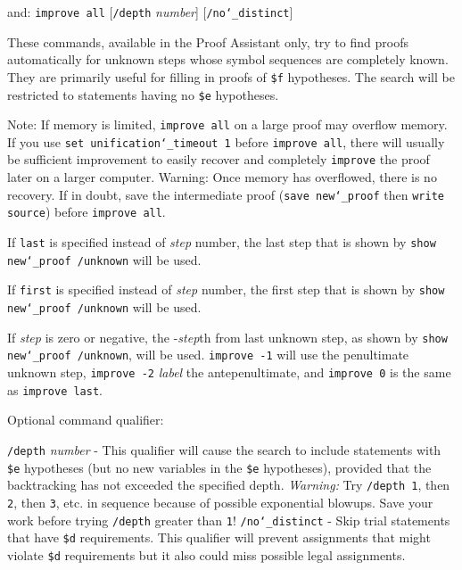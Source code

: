    and:   \texttt{improve all} [\texttt{/depth} {\em number}]
                                              [\texttt{/no{\char`\_}distinct}]

These commands, available in the Proof Assistant
only, try to find proofs automatically for unknown steps whose symbol
sequences are completely known.  They are primarily useful for filling in
proofs of \texttt{\$f} hypotheses.  The
search will be restricted to statements having no
\texttt{\$e} hypotheses.

\begin{sloppypar} %
Note:  If memory is limited, \texttt{improve all} on a large proof may
overflow memory.  If you use \texttt{set unification{\char`\_}timeout 1}
before \texttt{improve all}, there will usually be sufficient
improvement to easily recover and completely \texttt{improve} the proof
later on a larger computer.  Warning:  Once memory has overflowed, there
is no recovery.  If in doubt, save the intermediate proof (\texttt{save
new{\char`\_}proof} then \texttt{write source}) before \texttt{improve
all}.
\end{sloppypar}

If \texttt{last} is specified instead of {\em step} number, the last
step that is shown by \texttt{show new{\char`\_}proof /unknown} will be
used.

If \texttt{first} is specified instead of {\em step} number, the first
step that is shown by \texttt{show new{\char`\_}proof /unknown} will be
used.

If {\em step} is zero or negative, the -{\em step}th from last unknown
step, as shown by \texttt{show new{\char`\_}proof /unknown}, will be
used.  \texttt{improve -1} will use the penultimate
unknown step, \texttt{improve -2} {\em label} the antepenultimate, and
\texttt{improve 0} is the same as \texttt{improve last}.

Optional command qualifier:

    \texttt{/depth} {\em number} - This qualifier will cause the search
        to include
        statements with \texttt{\$e} hypotheses (but no new variables in
        the \texttt{\$e}
        hypotheses), provided that the backtracking has not exceeded the
        specified depth. {\em Warning:}  Try \texttt{/depth 1},
        then \texttt{2}, then \texttt{3}, etc.
        in sequence because of possible exponential blowups.  Save your
        work before trying \texttt{/depth} greater than \texttt{1}!
    \texttt{/no{\char`\_}distinct} - Skip trial statements that have
        \texttt{\$d} requirements.
        This qualifier will prevent assignments that might violate \texttt{\$d}
        requirements but it also could miss possible legal assignments.

